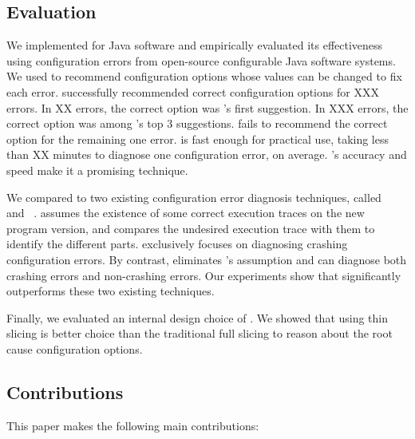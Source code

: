 \subsection{Evaluation}

We implemented \ourtool for Java software and empirically evaluated
its effectiveness using \errornum configuration errors
from \subjnum open-source configurable Java software systems. 
We used \ourtool to recommend configuration options whose values
can be changed to fix each error.
\ourtool successfully recommended correct configuration options
for XXX errors. In XX errors, the correct option was \ourtool's first
suggestion. In XXX errors, the correct option was among
\ourtool's top 3 suggestions. 
\ourtool fails to recommend the correct option for the remaining
one error. \ourtool is fast enough for practical use,
taking less than XX minutes to diagnose one configuration error, on average.
\ourtool's accuracy and speed make it a promising technique.


We compared \ourtool to two existing configuration error diagnosis
techniques, called \prevtool~\cite{Zhang:2013:ADS}
and \conftool~\cite{Rabkin:2011:PPC}.
\prevtool assumes the existence of some correct execution traces
on the new program version, and compares the undesired execution
trace with them to identify the different parts. \conftool exclusively
focuses on diagnosing crashing configuration errors.
By contrast, \ourtool eliminates \prevtool's assumption and
can diagnose both crashing errors and non-crashing errors. Our experiments
show that \ourtool significantly outperforms these two existing techniques.

Finally, we evaluated an internal design choice of \ourtool. We showed
that using thin slicing is better choice than the traditional full
slicing to reason about the root cause configuration options.


\subsection{Contributions}

This paper makes the following main contributions:

